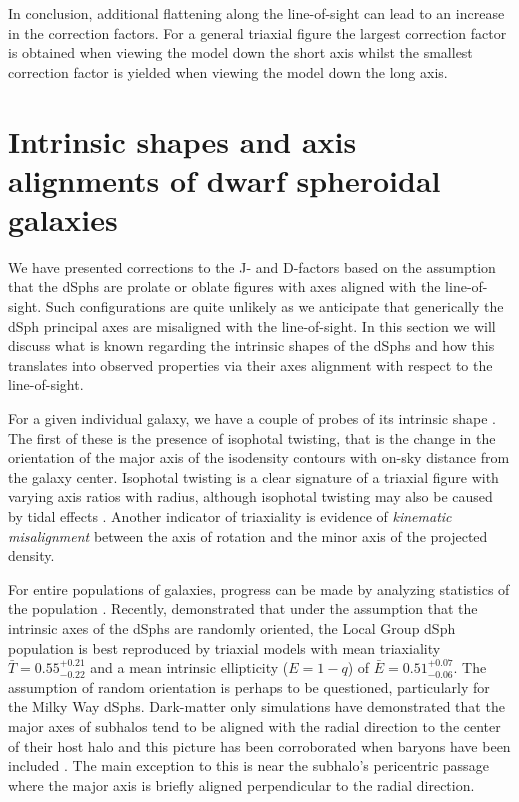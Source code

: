 \documentclass[prd,twocolumn,showpacs,preprintnumbers,superscriptaddress,nofootinbib,amsmath,amssymb,nobalancelastpage]{revtex4}
\begin{document}
In conclusion, additional flattening along the line-of-sight can lead to an increase in the correction factors. For a general triaxial figure the largest correction factor is obtained when viewing the model down the short axis whilst the smallest correction factor is yielded when viewing the model down the long axis.

\section{Intrinsic shapes and axis alignments of dwarf spheroidal galaxies}
We have presented corrections to the J- and D-factors based on the assumption that the dSphs are prolate or oblate figures with axes aligned with the line-of-sight. Such configurations are quite unlikely as we anticipate that generically the dSph principal axes are misaligned with the line-of-sight. In this section we will discuss what is known regarding the intrinsic shapes of the dSphs and how this translates into observed properties via their axes alignment with respect to the line-of-sight.

For a given individual galaxy, we have a couple of probes of its intrinsic shape \citep{Franx1991,Statler1994,vdB2009}. The first of these is the presence of isophotal twisting, that is the change in the orientation of the major axis of the isodensity contours with on-sky distance from the galaxy center. Isophotal twisting is a clear signature of a triaxial figure with varying axis ratios with radius, although isophotal twisting may also be caused by tidal effects \citep{Kormendy1982}. Another indicator of triaxiality is evidence of \emph{kinematic misalignment} between the axis of rotation and the minor axis of the projected density.

For entire populations of galaxies, progress can be made by analyzing statistics of the population \citep[e.g.][]{Weijmans2014}. Recently, \cite{SanchezJanssen2016} demonstrated that under the assumption that the intrinsic axes of the dSphs are randomly oriented, the Local Group dSph population is best reproduced by triaxial models with mean triaxiality $\bar T=0.55^{+0.21}_{-0.22}$ and a mean intrinsic ellipticity ($E=1-q$) of $\bar E = 0.51^{+0.07}_{-0.06}$. The assumption of random orientation is perhaps to be questioned, particularly for the Milky Way dSphs. Dark-matter only simulations \citep{Kuhlen2007,Barber2015} have demonstrated that the major axes of subhalos tend to be aligned with the radial direction to the center of their host halo and this picture has been corroborated when baryons have been included \citep{Knebe2010}. The main exception to this is near the subhalo's pericentric passage where the major axis is briefly aligned perpendicular to the radial direction.
\end{document}
